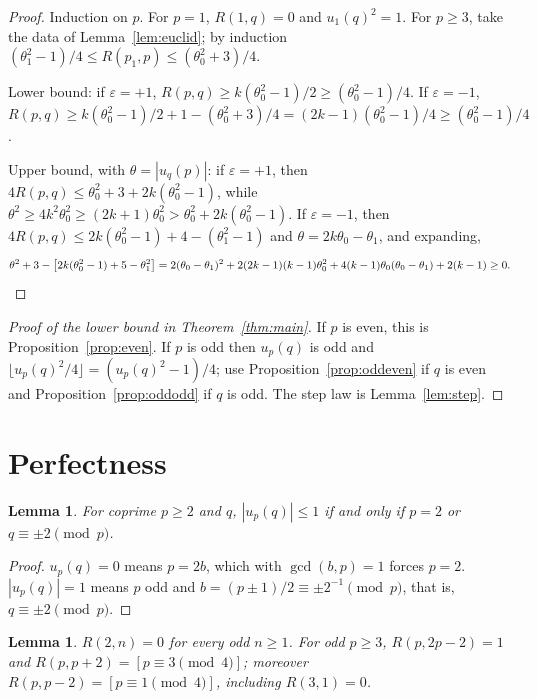 \documentclass[11pt,reqno]{amsart}
\theoremstyle{plain}
\newtheorem{lemma}[theorem]{Lemma}
\theoremstyle{definition}
\begin{document}
\begin{proof}
Induction on $p$. For $p=1$, $R(1,q)=0$ and $u_1(q)^2=1$. For $p\ge3$, take the data of
Lemma~\ref{lem:euclid}; by induction $(\theta_1^2-1)/4\le R(p_1,p)\le(\theta_0^2+3)/4$.

Lower bound: if $\varepsilon=+1$, $R(p,q)\ge k(\theta_0^2-1)/2\ge(\theta_0^2-1)/4$. If $\varepsilon=-1$,
$R(p,q)\ge k(\theta_0^2-1)/2+1-(\theta_0^2+3)/4=(2k-1)(\theta_0^2-1)/4\ge(\theta_0^2-1)/4$.

Upper bound, with $\theta=|u_q(p)|$: if $\varepsilon=+1$, then $4R(p,q)\le\theta_0^2+3+2k(\theta_0^2-1)$, while
$\theta^2\ge4k^2\theta_0^2\ge(2k+1)\theta_0^2>\theta_0^2+2k(\theta_0^2-1)$. If $\varepsilon=-1$, then
$4R(p,q)\le2k(\theta_0^2-1)+4-(\theta_1^2-1)$ and $\theta=2k\theta_0-\theta_1$, and
expanding,
\[
\theta^2+3-\bigl[2k(\theta_0^2-1)+5-\theta_1^2\bigr]
=2(\theta_0-\theta_1)^2+2(2k-1)(k-1)\theta_0^2+4(k-1)\theta_0(\theta_0-\theta_1)+2(k-1)\ge0.\qedhere
\]
\end{proof}

\begin{proof}[Proof of the lower bound in Theorem~\ref{thm:main}]
If $p$ is even, this is Proposition~\ref{prop:even}. If $p$ is odd then $u_p(q)$ is odd and
$\lfloor u_p(q)^2/4\rfloor=(u_p(q)^2-1)/4$; use Proposition~\ref{prop:oddeven} if $q$ is even and
Proposition~\ref{prop:oddodd} if $q$ is odd. The step law is Lemma~\ref{lem:step}.
\end{proof}

\section{Perfectness}\label{sec:perfect}

\begin{lemma}\label{lem:tau01}
For coprime $p\ge2$ and $q$, $|u_p(q)|\le1$ if and only if $p=2$ or $q\equiv\pm2\pmod p$.
\end{lemma}

\begin{proof}
$u_p(q)=0$ means $p=2b$, which with $\gcd(b,p)=1$ forces $p=2$. $|u_p(q)|=1$ means $p$ odd and
$b=(p\pm1)/2\equiv\pm2^{-1}\pmod p$, that is, $q\equiv\pm2\pmod p$.
\end{proof}

\begin{lemma}\label{lem:special}
$R(2,n)=0$ for every odd $n\ge1$. For odd $p\ge3$, $R(p,2p-2)=1$ and
$R(p,p+2)=[p\equiv3\pmod4]$; moreover $R(p,p-2)=[p\equiv1\pmod4]$, including $R(3,1)=0$.
\end{lemma}
\end{document}
